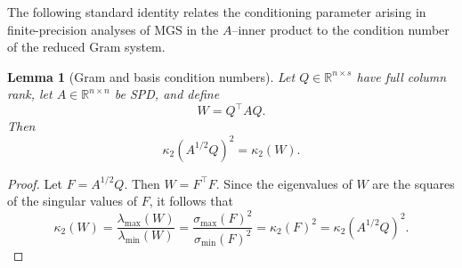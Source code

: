 \documentclass[pdflatex,sn-mathphys-num]{sn-jnl}%
\newtheorem{lemma}{Lemma}
\begin{document}
The following standard identity relates the conditioning parameter
arising in finite-precision analyses of MGS in the $A$--inner product
to the condition number of the reduced Gram system.

\begin{lemma}[Gram and basis condition numbers]
\label{lem:gram-kappa}
Let $Q\in\mathbb{R}^{n\times s}$ have full column rank, let
$A\in\mathbb{R}^{n\times n}$ be SPD, and define
\[
W=Q^\top A Q.
\]
Then
\[
\kappa_2(A^{1/2}Q)^2=\kappa_2(W).
\]
\end{lemma}

\begin{proof}
Let $F=A^{1/2}Q$. Then $W=F^\top F$. Since the eigenvalues
of $W$ are the squares of the singular values of $F$, it follows that
\[
\kappa_2(W)
=
\frac{\lambda_{\max}(W)}{\lambda_{\min}(W)}
=
\frac{\sigma_{\max}(F)^2}{\sigma_{\min}(F)^2}
=
\kappa_2(F)^2
=
\kappa_2(A^{1/2}Q)^2.
\]
\end{proof}
\end{document}
